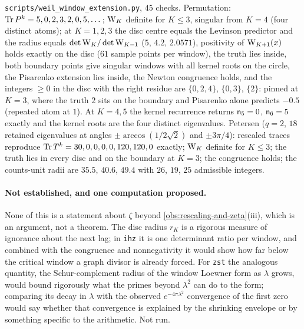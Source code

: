 \begin{numerical}
\label{num:weil-window-extension}
\texttt{scripts/weil\_window\_extension.py}, $45$ checks. Permutation: $\operatorname{Tr} P^k =
5,0,2,3,2,0,5,\dots$; $\mathrm{W}_K$ definite for $K\le3$, singular from $K = 4$ (four distinct
atoms); at $K = 1,2,3$ the disc centre equals the Levinson predictor and the radius equals
$\det\mathrm{W}_K/\det\mathrm{W}_{K-1}$ ($5$, $4.2$, $2.0571$), positivity of $\mathrm{W}_{K+1}(x)$ holds
exactly on the disc ($61$ sample points per window), the truth lies inside, both boundary points
give singular windows with all kernel roots on the circle, the Pisarenko extension lies inside,
the Newton congruence holds, and the integers $\ge0$ in the disc with the right residue are
$\{0,2,4\}$, $\{0,3\}$, $\{2\}$: pinned at $K = 3$, where the truth $2$ sits on the boundary and
Pisarenko alone predicts $-0.5$ (repeated atom at $1$). At $K = 4,5$ the kernel recurrence returns
$\mathsf n_{5} = 0$, $\mathsf n_{6} = 5$ exactly and the kernel roots are the four distinct eigenvalues.
Petersen ($q = 2$, $18$ retained eigenvalues at angles $\pm\arccos(1/2\sqrt2)$ and $\pm3\pi/4$):
rescaled traces reproduce $\operatorname{Tr}T^k = 30,0,0,0,0,120,120,0$ exactly; $\mathrm{W}_K$ definite for
$K\le3$; the truth lies in every disc and on the boundary at $K = 3$; the congruence holds; the
counts-unit radii are $35.5$, $40.6$, $49.4$ with $26$, $19$, $25$ admissible integers.
\end{numerical}

\paragraph{Not established, and one computation proposed.}
None of this is a statement about $\zeta$ beyond \cref{obs:rescaling-and-zeta}(iii), which is an
argument, not a theorem. The disc radius $r_K$ is a rigorous measure of ignorance about the next
lag; in \texttt{ihz} it is one determinant ratio per window, and combined with the congruence
and nonnegativity it would show how far below the critical window a graph divisor is already
forced. For \texttt{zst} the analogous quantity, the Schur-complement radius of the window
Loewner form as $\lambda$ grows, would bound rigorously what the primes beyond $\lambda^2$ can do
to the form; comparing its decay in $\lambda$ with the observed $e^{-4\pi\lambda^2}$ convergence
of the first zero would say whether that convergence is explained by the shrinking envelope or by
something specific to the arithmetic. Not run.
